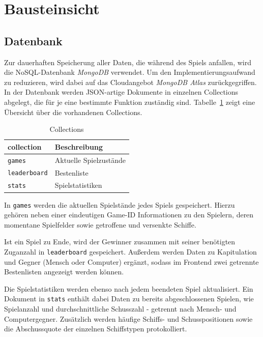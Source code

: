 \documentclass[a4paper, 10pt, conference]{IEEEtran}
\begin{document}
\section{Bausteinsicht}\label{sec:bausteinsicht}



\subsection{Datenbank}\label{subsec:datenbank}
Zur dauerhaften Speicherung aller Daten, die während des Spiels anfallen, wird die NoSQL-Datenbank \textit{MongoDB} verwendet. Um den Implementierungsaufwand zu reduzieren, wird dabei auf das Cloudangebot \textit{MongoDB Atlas} zurückgegriffen. In der Datenbank werden JSON-artige Dokumente in einzelnen Collections abgelegt, die für je eine bestimmte Funktion zuständig sind. Tabelle~\ref{tab:collections} zeigt eine Übersicht über die vorhandenen Collections.

\begin{table}[h!]
    \begin{center}
        \caption{Collections}
        \label{tab:collections}
        \begin{tabular}{|l|l|}
            \textbf{collection} & \textbf{Beschreibung}\\
            \hline
            \texttt{games}				& Aktuelle Spielzustände\\
            \texttt{leaderboard}					& Bestenliste\\
            \texttt{stats}	& Spielstatistiken\\
        \end{tabular}
    \end{center}
\end{table}

In \texttt{games} werden die aktuellen Spielstände jedes Spiels gespeichert. Hierzu gehören neben einer eindeutigen Game-ID Informationen zu den Spielern, deren momentane Spielfelder sowie getroffene und versenkte Schiffe.

Ist ein Spiel zu Ende, wird der Gewinner zusammen mit seiner benötigten Zuganzahl in \texttt{leaderboard} gespeichert. Außerdem werden Daten zu Kapitulation und Gegner (Mensch oder Computer) ergänzt, sodass im Frontend zwei getrennte Bestenlisten angezeigt werden können.

Die Spielstatistiken werden ebenso nach jedem beendeten Spiel aktualisiert. Ein Dokument in \texttt{stats} enthält dabei Daten zu bereits abgeschlossenen Spielen, wie Spielanzahl und durchschnittliche Schusszahl - getrennt nach Mensch- und Computergegner. Zusätzlich werden häufige Schiffs- und Schusspositionen sowie die Abschussquote der einzelnen Schiffstypen protokolliert.
\end{document}
